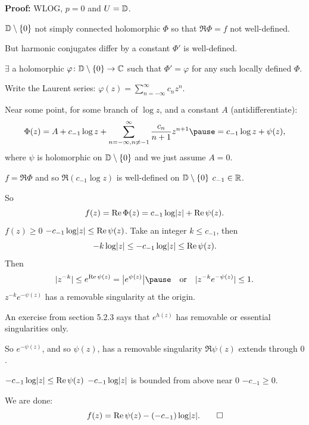 \documentclass[10pt,aspectratio=169]{beamer}
\begin{document}
\begin{frame}

\textbf{Proof:}
WLOG, $p=0$ and $U = {\mathbb{D}}$.

\medskip
\pause

${\mathbb{D}} \setminus \{ 0 \}$ not simply connected
\wthus
holomorphic $\Phi$ so that $\Re \Phi = f$ not well-defined.

\medskip
\pause

But harmonic conjugates differ by a constant \wthus $\Phi'$ is well-defined.

\medskip
\pause

$\exists$ a holomorphic $\varphi \colon {\mathbb{D}} \setminus \{ 0 \} \to {\mathbb{C}}$ such
that $\Phi' = \varphi$ for any such locally defined $\Phi$.

\medskip
\pause

Write the Laurent series:
\quad
$\displaystyle
\varphi(z) = \sum_{n=-\infty}^\infty c_n {z}^n$.

\medskip
\pause

Near some point, for some branch of $\log z$, and a constant $A$ (antidifferentiate):
\[
\Phi(z) =
A+
c_{-1} \log z +  
\sum_{n=-\infty,n \neq -1}^\infty \frac{c_n}{n+1} {z}^{n+1}
\pause
=
c_{-1} \log z +  
\psi(z),
\]
where $\psi$ is holomorphic
on ${\mathbb{D}} \setminus \{ 0 \}$
and we just assume $A=0$.


\medskip
\pause

$f = \Re \Phi$ and so $\Re (c_{-1} \log z)$ is well-defined on ${\mathbb{D}} \setminus
\{ 0 \}$
\wthus $c_{-1} \in {\mathbb{R}}$.

\end{frame}

\begin{frame}
So
\[
f(z) = \operatorname{Re} \Phi(z) =
c_{-1} \log \lvert {z} \rvert +  
\operatorname{Re} \psi(z).
\]
\pause
$f(z) \geq 0$ \wthus
$-c_{-1} \log \lvert {z} \rvert \leq  \operatorname{Re} \psi(z)$.
\pause
\qquad
Take an integer $k \leq c_{-1}$, then
\[
-k \log \lvert {z} \rvert \leq
-c_{-1} \log \lvert {z} \rvert \leq  \operatorname{Re} \psi(z) .
\]
\pause
Then
\[
\sabs{z^{-k}} \leq e^{\Re \psi(z)} = \babs{e^{\psi(z)}} 
\pause
\quad
\text{or}
\quad
\sabs{z^{-k} e^{-\psi(z)}} \leq 1 .
\]
\pause
$z^{-k} e^{-\psi(z)}$ has
a removable singularity at the origin.

\medskip
\pause

An exercise from section 5.2.3 says that
$e^{h(z)}$ has removable or essential singularities only.

\pause
\medskip

So $e^{-\psi(z)}$, and so $\psi(z)$, has a removable singularity
\wthus
$\Re \psi(z)$ extends through $0$.

\medskip
\pause

$-c_{-1} \log\lvert {z} \rvert \leq \operatorname{Re} \psi(z)$
\wthus
$-c_{-1} \log\lvert {z} \rvert$ is bounded from above near $0$
\wthus
$-c_{-1} \geq 0$.

\medskip
\pause

We are done:
\[
f(z) = \operatorname{Re} \psi(z) - (-c_{-1}) \log \lvert {z} \rvert . \qed
\]

\end{frame}
\end{document}
